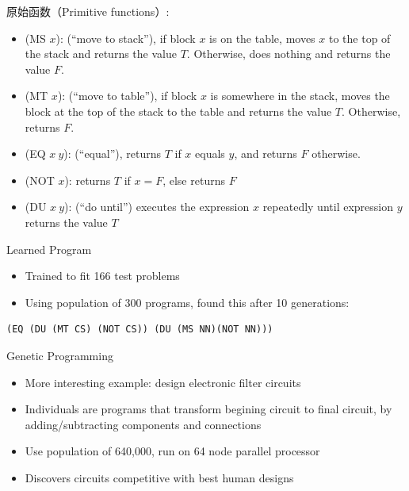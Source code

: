 \documentclass[presentation]{beamer}
\begin{document}
\begin{frame}[label={sec:org8741abe}]{原始函数（Primitive functions）:}
\begin{itemize}
\item (MS \(x\)): (``move to stack''), if block \(x\) is on the table, moves \(x\) to the
top of the stack and returns the value \(T\).  Otherwise, does nothing and
returns the value \(F\).
\item (MT \(x\)): (``move to table''), if block \(x\) is somewhere in the stack, moves
the block at the top of the stack to the table and returns the value \(T\).
Otherwise, returns \(F\).
\item (EQ \(x \ y\)): (``equal''), returns \(T\) if \(x\) equals \(y\), and returns \(F\)
otherwise.
\item (NOT \(x\)): returns \(T\) if \(x=F\), else returns \(F\)
\item (DU \(x \ y\)): (``do until'') executes the expression \(x\) repeatedly
until expression \(y\) returns the value \(T\)
\end{itemize}
\end{frame}
\begin{frame}[label={sec:org47b9c77},fragile]{Learned Program}
 \begin{itemize}
\item Trained to fit 166 test problems
\item Using population of 300 programs, found this after 10 generations:
\end{itemize}
\begin{verbatim}
(EQ (DU (MT CS) (NOT CS)) (DU (MS NN)(NOT NN)))
\end{verbatim}
\end{frame}
\begin{frame}[label={sec:orgf46be81}]{Genetic Programming}
\begin{itemize}
\item More interesting example: design electronic filter circuits
\item Individuals are programs that transform begining circuit to final
circuit, by adding/subtracting components and connections
\item Use population of 640,000, run on 64 node parallel processor
\item Discovers circuits competitive with best human designs
\end{itemize}
\end{frame}
\end{document}
